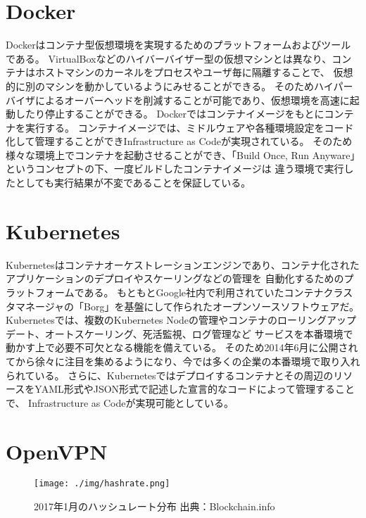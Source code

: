 \section{Docker}
\label{background:docker}
Dockerはコンテナ型仮想環境を実現するためのプラットフォームおよびツールである。
VirtualBoxなどのハイバーバイザー型の仮想マシンとは異なり、コンテナはホストマシンのカーネルをプロセスやユーザ毎に隔離することで、
仮想的に別のマシンを動かしているようにみせることができる。
そのためハイパーバイザによるオーバーヘッドを削減することが可能であり、仮想環境を高速に起動したり停止することができる。
Dockerではコンテナイメージをもとにコンテナを実行する。
コンテナイメージでは、ミドルウェアや各種環境設定をコード化して管理することができInfrastructure as Codeが実現されている。
そのため様々な環境上でコンテナを起動させることができ、「Build Once, Run Anyware」というコンセプトの下、一度ビルドしたコンテナイメージは
違う環境で実行したとしても実行結果が不変であることを保証している。

\section{Kubernetes}
\label{background:kubernetes}
Kubernetesはコンテナオーケストレーションエンジンであり、コンテナ化されたアプリケーションのデプロイやスケーリングなどの管理を
自動化するためのプラットフォームである。
もともとGoogle社内で利用されていたコンテナクラスタマネージャの「Borg」を基盤にして作られたオープンソースソフトウェアだ。
Kubernetesでは、複数のKubernetes Nodeの管理やコンテナのローリングアップデート、オートスケーリング、死活監視、ログ管理など
サービスを本番環境で動かす上で必要不可欠となる機能を備えている。
そのため2014年6月に公開されてから徐々に注目を集めるようになり、今では多くの企業の本番環境で取り入れられている。
さらに、Kubernetesではデプロイするコンテナとその周辺のリソースをYAML形式やJSON形式で記述した宣言的なコードによって管理することで、
Infrastructure as Codeが実現可能としている。

\section{OpenVPN}
\label{background:openvpn}

\begin{figure}[h]
    \begin{center}
        \texttt{[image: ./img/hashrate.png]}
        \caption{2017年1月のハッシュレート分布 出典：Blockchain.info\cite{bitcoinhashrate}}
        \label{img:hashrate}
    \end{center}
\end{figure}
\fi
